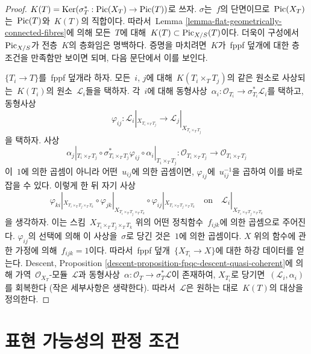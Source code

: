 \begin{proof}
$K(T) = \mathop{\mathrm{Ker}}(\sigma_T^* : \mathop{\mathrm{Pic}}\nolimits(X_T) \to \mathop{\mathrm{Pic}}\nolimits(T))$로 쓰자.
$\sigma$는\  $f$의 단면이므로\  $\mathop{\mathrm{Pic}}\nolimits(X_T)$는\  $\mathop{\mathrm{Pic}}\nolimits(T)$와\  $K(T)$의 직합이다.
따라서\  Lemma \ref{lemma-flat-geometrically-connected-fibres}에 의해 모든\ 
$T$에 대해\  $K(T) \subset \mathrm{Pic}_{X/S}(T)$이다. 더욱이 구성에서\ 
$\mathrm{Pic}_{X/S}$가 전층\  $K$의 층화임은 명백하다. 증명을 마치려면\ 
$K$가\  fppf 덮개에 대한 층 조건을 만족함만 보이면 되며, 다음 문단에서
이를 보인다.

\medskip\noindent
$\{T_i \to T\}$를\  fppf 덮개라 하자. 모든\  $i$, $j$에 대해\ 
$K(T_i \times_T T_j)$의 같은 원소로 사상되는\  $K(T_i)$의 원소\ 
$\mathcal{L}_i$들을 택하자. 각\  $i$에 대해 동형사상\ 
$\alpha_i : \mathcal{O}_{T_i} \to \sigma_{T_i}^*\mathcal{L}_i$를 택하고,
동형사상
$$
\varphi_{ij} :
\mathcal{L}_i|_{X_{T_i \times_T T_j}}
\longrightarrow
\mathcal{L}_j|_{X_{T_i \times_T T_j}}
$$
을 택하자. 사상
$$
\alpha_j|_{T_i \times_T T_j} \circ
\sigma_{T_i \times_T T_j}^*\varphi_{ij} \circ
\alpha_i|_{T_i \times_T T_j} :
\mathcal{O}_{T_i \times_T T_j} \to \mathcal{O}_{T_i \times_T T_j}
$$
이\  $1$에 의한 곱셈이 아니라 어떤\  $u_{ij}$에 의한 곱셈이면,
$\varphi_{ij}$에\  $u_{ij}^{-1}$을 곱하여 이를 바로잡을 수 있다.
이렇게 한 뒤 자기 사상
$$
\varphi_{ki}|_{X_{T_i \times_T T_j \times_T T_k}} \circ
\varphi_{jk}|_{X_{T_i \times_T T_j \times_T T_k}} \circ
\varphi_{ij}|_{X_{T_i \times_T T_j \times_T T_k}}
\quad\text{on}\quad
\mathcal{L}_i|_{X_{T_i \times_T T_j \times_T T_k}}
$$
을 생각하자. 이는 스킴\  $X_{T_i \times_T T_j \times_T T_k}$ 위의 어떤
정칙함수\  $f_{ijk}$에 의한 곱셈으로 주어진다. $\varphi_{ij}$의 선택에 의해
이 사상을\  $\sigma$로 당긴 것은\  $1$에 의한 곱셈이다. $X$ 위의 함수에 관한
가정에 의해\  $f_{ijk} = 1$이다. 따라서\  fppf 덮개\ 
$\{X_{T_i} \to X\}$에 대한 하강 데이터를 얻는다. Descent, Proposition
\ref{descent-proposition-fpqc-descent-quasi-coherent}에 의해 가역\ 
$\mathcal{O}_{X_T}$-모듈\  $\mathcal{L}$과 동형사상\ 
$\alpha : \mathcal{O}_T \to \sigma_T^*\mathcal{L}$이 존재하여,
$X_{T_i}$로 당기면\  $(\mathcal{L}_i, \alpha_i)$를 회복한다
(작은 세부사항은 생략한다). 따라서\  $\mathcal{L}$은 원하는 대로\ 
$K(T)$의 대상을 정의한다.
\end{proof}



\section{표현 가능성의 판정 조건}
\label{section-representability}

